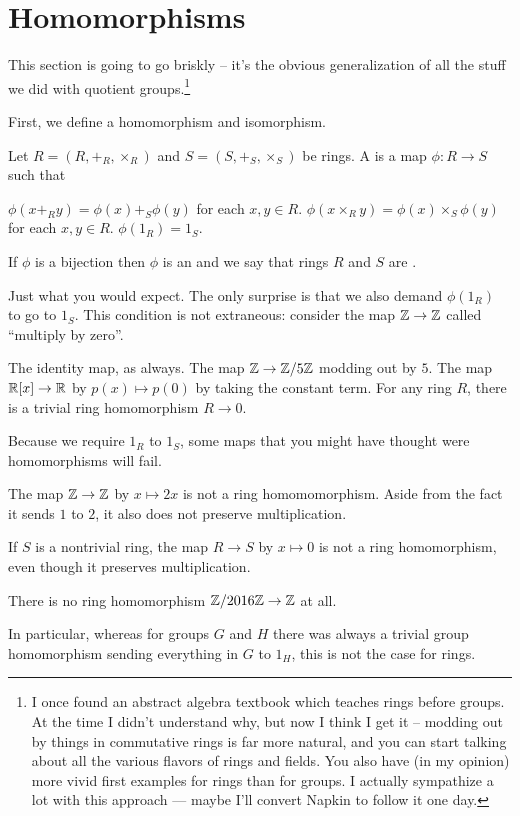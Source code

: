 \section{Homomorphisms}
This section is going to go briskly --
it's the obvious generalization of all the stuff
we did with quotient groups.\footnote{I once found an
	abstract algebra textbook which teaches rings before groups.
	At the time I didn't understand why,
	but now I think I get it -- modding out by things in
	commutative rings is far more natural, and you can start talking
	about all the various flavors of rings and fields.
	You also have (in my opinion) more vivid first examples
	for rings than for groups.
	I actually sympathize a lot with this approach --- maybe I'll convert
	Napkin to follow it one day.}

First, we define a homomorphism and isomorphism.
\begin{definition}
	Let $R = (R, +_R, \times_R)$ and $S = (S, +_S, \times_S)$ be rings.
	A  is a map $\phi : R \to S$
	such that 
	\begin{enumerate}[(i)]
		\ii $\phi(x +_R y) = \phi(x) +_S \phi(y)$ for each $x,y \in R$.
		\ii $\phi(x \times_R y) = \phi(x) \times_S \phi(y)$ for each $x,y \in R$.
		\ii $\phi(1_R) = 1_S$.
	\end{enumerate}
	If $\phi$ is a bijection then $\phi$ is an 
	and we say that rings $R$ and $S$ are .
\end{definition}
Just what you would expect.
The only surprise is that we also demand $\phi(1_R)$ to go to $1_S$.
This condition is not extraneous:
consider the map $\mathbb Z \to \mathbb Z$ called ``multiply by zero''.
\begin{example}
	\listhack
	\begin{enumerate}[(a)]
		\ii The identity map, as always.
		\ii The map $\mathbb Z \to \mathbb Z/5\mathbb Z$ modding out by $5$.
		\ii The map $\mathbb R[x] \to \mathbb R$ by $p(x) \mapsto p(0)$
		by taking the constant term.
		\ii For any ring $R$, there is a trivial ring homomorphism $R \to 0$.
	\end{enumerate}
\end{example}
\begin{example}
	Because we require $1_R$ to $1_S$, some maps that you
	might have thought were homomorphisms will fail.
	\begin{enumerate}[(a)]
		\ii The map $\mathbb Z \to \mathbb Z$ by $x \mapsto 2x$
		is not a ring homomomorphism.
		Aside from the fact it sends $1$ to $2$,
		it also does not preserve multiplication.

		\ii If $S$ is a nontrivial ring,
		the map $R \to S$ by $x \mapsto 0$ is not
		a ring homomorphism, even though it preserves multiplication.

		\ii There is no ring homomorphism $\mathbb Z/2016\mathbb Z \to \mathbb Z$ at all.
	\end{enumerate}
	In particular, whereas for groups $G$ and $H$
	there was always a trivial group homomorphism sending
	everything in $G$ to $1_H$, this is not the case for rings.
\end{example}

